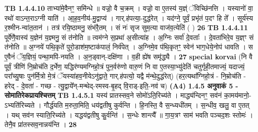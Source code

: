 \documentclass[17pt]{extarticle}
\begin{document}
                  \newline
                                \textbf{ TB 1.4.4.10} \newline
                  ताभ्या॑मे॒वैनꣳ॒॒ समि॑न्धे ॥ वज्रो॒ वै च॒क्रम् । वज्रो॒ वा ए॒तस्य॑ य॒ज्ञ्ं ॅविच्छि॑नत्ति । यस्यानो॑ वा॒ रथो॑ वाऽन्त॒राऽग्नी याति॑ । आ॒ह॒व॒नीय॑-मु॒द्वाप्य॑ । गार्.ह॑पत्या॒-दुद्ध॑रेत् । यद॑ग्ने॒ पूर्वं॒ प्रभृ॑तं प॒दꣳ हि ते᳚ । सूर्य॑स्य र॒श्मीन-न्वा॑त॒तान॑ । तत्र॑ रयि॒ष्ठामनु॒ संभ॑रै॒तम् । सं नः॑ सृज सुम॒त्या वाज॑व॒त्येति॑ ( ) \textbf{ 26} \newline
                  \newline
                                \textbf{ TB 1.4.4.11} \newline
                  पूर्वे॑णै॒वास्य॑ य॒ज्ञेन॑ य॒ज्ञ्मनु॒ सं त॑नोति ॥ त्वम॑ग्ने स॒प्रथा॑ अ॒सीत्या॑ह । अ॒ग्निः सर्वा॑ दे॒वताः᳚ । दे॒वता॑भिरे॒व य॒ज्ञ्ꣳ सं त॑नोति ॥ अ॒ग्नये॑ पथि॒कृते॑ पुरो॒डाश॑म॒ष्टाक॑पालं॒ निर्व॑पेत् । अ॒ग्निमे॒व प॑थि॒कृतꣳ॒॒ स्वेन॑ भाग॒धेये॒नोप॑ धावति । स ए॒वैनं॑ ॅय॒ज्ञियं॒ पन्था॒मपि॑-नयति । अ॒न॒ड्वान्-दक्षि॑णा । व॒ही ह्ये॑ष समृ॑द्ध्यै । \textbf{ 27} \newline
                  \newline
                                                        \textbf{special korvai} \newline
              (नि वै पूर्वं॒ त्रीणि॑ नि॒म्रोच॑ति द॒र्भेण॒ यद्धिर॑ण्यमग्निहो॒त्रं पुन॒र्वरु॑णो वारु॒णं नि वा ए॒तस्या॒भ्यु॑देति॑ चतुर्गृही॒तमाज्यं॒ यदाज्यं॒ परा᳚च्यु॒षाः पुन॑र्मि॒त्रो मे॒त्रं ॅयस्या॑हव॒नीयेऽनु॑द्वाते॒ गार्.ह॑पत्यो॒ यद्वै म॑न्थे॒दुद्ध॑रेत्) \newline
                                (हर॒त्यथा᳚ग्निहो॒त्रं - नि॒म्रोच॑ति - हरेद् - दे॒वता॑ - गच्छ - त्यु॒द्वाये᳚न्-मन्थेद्-रमस्व-बृ॒हद् वि॒राड्-इति॒-नव॑ च) \textbf{(A4)} \newline \newline
                \textbf{ 1.4.5      अनुवाकं   5 - सोमातिरेकप्रायश्चित्तम्} \newline
                                \textbf{ TB 1.4.5.1} \newline
                  यस्य॑ प्रातस्सव॒ने सोमो॑ऽति॒रिच्य॑ते । माद्ध्य॑न्दिनꣳ॒॒ सव॑नं का॒मय॑मानो॒-ऽभ्यति॑रिच्यते । गौर्द्ध॑यति म॒रुता॒मिति॒ धय॑द्वतीषु कुर्वन्ति । हि॒नस्ति॒ वै स॒न्ध्यधी॑तम् । स॒न्धीव॒ खलु॒ वा ए॒तत् । यथ् सव॑न स्याति॒रिच्य॑ते । यद्धय॑द्वतीषु कु॒र्वन्ति॑ । स॒न्धेः शान्त्यै᳚ ॥ गा॒य॒त्रꣳ साम॑ भवति पञ्चद॒शः स्तोमः॑ । तेनै॒व प्रा॑तस्सव॒नान्नय॑न्ति । \textbf{ 28} \newline
                  \newline
\end{document}
